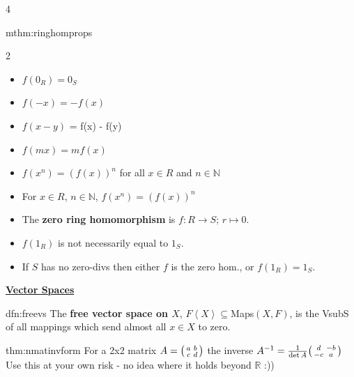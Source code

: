 \documentclass[landscape, 8pt]{extarticle}
\begin{document}
\begin{multicols*}{4}
\begin{mthm}{mthm:ringhomprops}{ }
			\vspace*{-5ex}
			
			\begin{multicols}{2}
				\begin{itemize}
					\item $f(0_{R}) = 0_{S}$
					\item $f(-x) = -f(x)$
					\item $f(x - y)$ = f(x) - f(y)
					\item $f(mx) = mf(x)$
					\item $f(x^{n}) = (f(x))^{n}$ for all $x\in R$ and $n\in \mathbb{N}$
					\item For $x\in R$, $n\in \mathbb{N}$, $f(x^n) = (f(x))^n$
				\end{itemize}
			\end{multicols}
			
			\vspace*{-5ex}
			
			\begin{itemize}
				\item The \textbf{zero ring homomorphism} is $f: R \to S$; $r \mapsto 0$.
				\item $f(1_R)$ is not necessarily equal to $1_S$.
				\item If $S$ has no zero-divs then either $f$ is the zero hom., or $f(1_R) = 1_S$.
			\end{itemize}
			
			\end{mthm}
		
		
		
		
		
		{\footnotesize \textbf{\underline{Vector Spaces}}}
		
		
		
		\begin{dfn}{dfn:freevs}{ }
		The \textbf{free vector space on $X$}, $F \left\langle X\right\rangle \subseteq$Maps$(X, F)$, is the VsubS of all mappings which send almost all $x \in X$ to zero.
		
		\end{dfn}
		
		
		\begin{thm}{thm:nmatinvform}{ }
			For a 2x2 matrix $A = \begin{psmallmatrix*}
				a&b\\
				c&d
			\end{psmallmatrix*}
			$
			the inverse $A^{-1} = \frac{1}{\det A} \begin{psmallmatrix*}
				d&-b\\
				-c&a
			\end{psmallmatrix*}
			$
			Use this at your own risk - no idea where it holds beyond $\mathbb{R}$ :))
			

\end{thm}
\end{multicols*}
\end{document}
